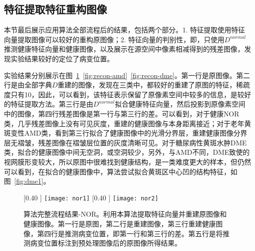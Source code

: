 
    \subsection{特征提取特征重构图像}
    本节最后展示应用算法全部流程后的结果，包括两个部分。1. 特征提取使用特征向量提取图像可以较好的重构原图像；2. 特征向量的判别性，即，只使用$D^{normal}$推测健康特征向量和健康图像，以及展示在源空间中像素相减得到的残差图像，发现实验结果较好的定位了病变位置。

    实验结果分别展示在图~\ref{fig:recon-nor}~\ref{fig:recon-amd}~\ref{fig:recon-dme}。第一行是原图像。第二行是由全部字典$D$重建的图像，发现在三类中，都较好的重建了原图的特征，稀疏度只有10，因此，可以看到，该特征表示保留了原像素空间中较多的信息，是较好的特征提取方法。第三行是由$D^{normal}$拟合健康特征向量，然后投影到原像素空间中的图像，第四行残差图像是第一行与第三行的差。可以看到，对于健康NOR类，几乎残差图像上没有可见灰度，重建的健康图像与本身距离接近；对于老年黄斑变性AMD类，看到第三行拟合了健康图像中的光滑分界层，重建健康图像分界层无褶皱，残差图像在褶皱层位置的灰度清晰可见。对于糖尿病性黄斑水肿DME类，拟合的健康图像中间无空洞，或空洞较少，另外，与AMD不同，DME致使的视网膜形变较大，所以原图中很难找到健康结构，是一类难度更大的样本，但仍然可以看到，在拟合的健康图像中，算法尝试拟合黄斑区中心凹的结构特征，如图~\ref{fig:dme1}。

    \begin{figure}[htb]
      \centering%
      [0.40 \textwidth] %
        {\texttt{[image: nor1]}} %
      [0.40 \textwidth] %
        {\texttt{[image: nor2]}} \\
      \caption[算法完整流程结果-NOR]{算法完整流程结果-NOR。利用本算法提取特征向量并重建原图像和健康图像。第一行是原图，第二行是重建图像，第三行重建健康图像，第四行是推测病变位置，即第一行和第三行的差。第五行是将推测病变位置标注到预处理图像后的原图像所得结果。}
      \label{fig:recon-nor}
    \end{figure}

